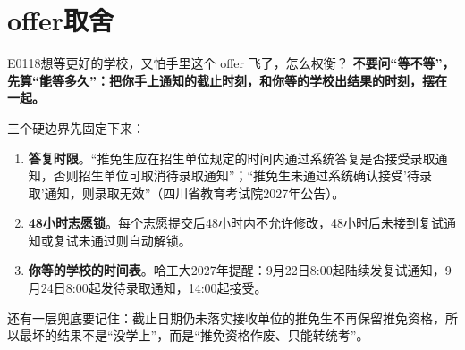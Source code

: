 \section{offer取舍}
\begin{qa}{E0118}{想等更好的学校，又怕手里这个 offer 飞了，怎么权衡？}
\textbf{不要问“等不等”，先算“能等多久”：把你手上通知的截止时刻，和你等的学校出结果的时刻，摆在一起。}

三个硬边界先固定下来：

\begin{enumerate}
  \item \textbf{答复时限}。“推免生应在招生单位规定的时间内通过系统答复是否接受录取通知，否则招生单位可取消待录取通知”；“推免生未通过系统确认接受'待录取'通知，则录取无效”（四川省教育考试院2027年公告）。
  \item \textbf{48小时志愿锁}。每个志愿提交后48小时内不允许修改，48小时后未接到复试通知或复试未通过则自动解锁。
  \item \textbf{你等的学校的时间表}。哈工大2027年提醒：9月22日8:00起陆续发复试通知，9月24日8:00起发待录取通知，14:00起接受。
\end{enumerate}

还有一层兜底要记住：截止日期仍未落实接收单位的推免生不再保留推免资格，所以最坏的结果不是“没学上”，而是“推免资格作废、只能转统考”。
\end{qa}

